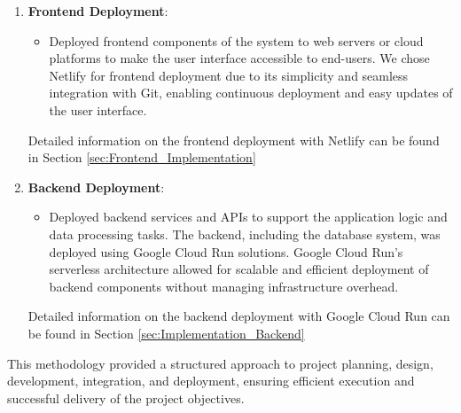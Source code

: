 \begin{enumerate}
    \item \textbf{Frontend Deployment}:
        \begin{itemize}
            \item Deployed frontend components of the system to web servers or cloud platforms to make the user interface accessible to end-users. We chose Netlify for frontend deployment due to its simplicity and seamless integration with Git, enabling continuous deployment and easy updates of the user interface.
        \end{itemize}
        Detailed information on the frontend deployment with Netlify can be found in Section \ref{sec:Frontend_Implementation} 

    \item \textbf{Backend Deployment}:
        \begin{itemize}
            \item Deployed backend services and APIs to support the application logic and data processing tasks. The backend, including the database system, was deployed using Google Cloud Run solutions. Google Cloud Run's serverless architecture allowed for scalable and efficient deployment of backend components without managing infrastructure overhead.
        \end{itemize}
        Detailed information on the backend deployment with Google Cloud Run can be found in Section \ref{sec:Implementation_Backend}
\end{enumerate}

This methodology provided a structured approach to project planning, design, development, integration, and deployment, ensuring efficient execution and successful delivery of the project objectives.
